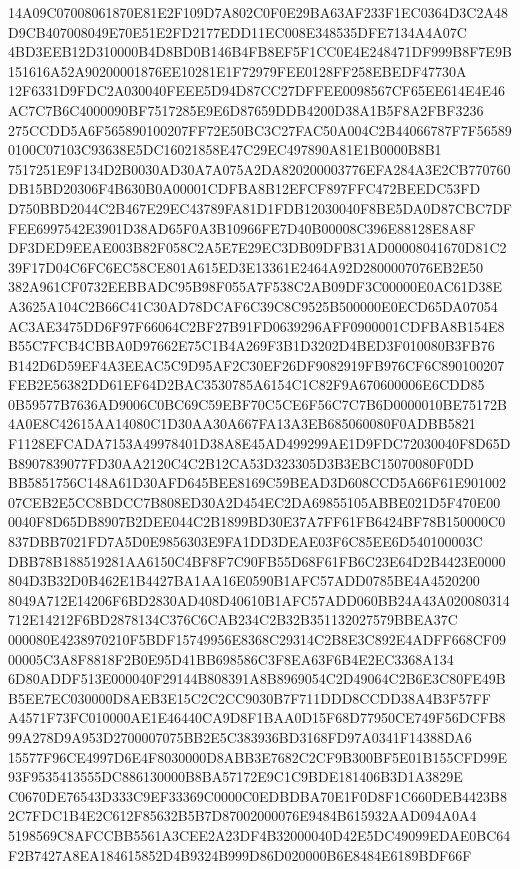 \documentclass[UTF8,fontset=fandol,zihao=-4,a4paper]{ctexart}
\begin{document}
{{14A09C07008061870E81E2F109D7A802C0F0E29BA63AF233F1EC0364D3C2A48D9CB407008049E70E51E2FD2177EDD11EC008E348535DFE7134A4A07C
4BD3EEB12D310000B4D8BD0B146B4FB8EF5F1CC0E4E248471DF999B8F7E9B151616A52A90200001876EE10281E1F72979FEE0128FF258EBEDF47730A
12F6331D9FDC2A030040FEEE5D94D87CC27DFFEE0098567CF65EE614E4E46AC7C7B6C4000090BF7517285E9E6D87659DDB4200D38A1B5F8A2FBF3236
275CCDD5A6F565890100207FF72E50BC3C27FAC50A004C2B44066787F7F565890100C07103C93638E5DC16021858E47C29EC497890A81E1B0000B8B1
7517251E9F134D2B0030AD30A7A075A2DA820200003776EFA284A3E2CB770760DB15BD20306F4B630B0A00001CDFBA8B12EFCF897FFC472BEEDC53FD
D750BBD2044C2B467E29EC43789FA81D1FDB12030040F8BE5DA0D87CBC7DFFEE6997542E3901D38AD65F0A3B10966FE7D40B00008C396E88128E8A8F
DF3DED9EEAE003B82F058C2A5E7E29EC3DB09DFB31AD00008041670D81C239F17D04C6FC6EC58CE801A615ED3E13361E2464A92D2800007076EB2E50
382A961CF0732EEBBADC95B98F055A7F538C2AB09DF3C00000E0AC61D38EA3625A104C2B66C41C30AD78DCAF6C39C8C9525B500000E0ECD65DA07054
AC3AE3475DD6F97F66064C2BF27B91FD0639296AFF0900001CDFBA8B154E8B55C7FCB4CBBA0D97662E75C1B4A269F3B1D3202D4BED3F010080B3FB76
B142D6D59EF4A3EEAC5C9D95AF2C30EF26DF9082919FB976CF6C890100207FEB2E56382DD61EF64D2BAC3530785A6154C1C82F9A670600006E6CDD85
0B59577B7636AD9006C0BC69C59EBF70C5CE6F56C7C7B6D0000010BE75172B4A0E8C42615AA14080C1D30AA30A667FA13A3EB685060080F0ADBB5821
F1128EFCADA7153A49978401D38A8E45AD499299AE1D9FDC72030040F8D65DB8907839077FD30AA2120C4C2B12CA53D323305D3B3EBC15070080F0DD
BB5851756C148A61D30AFD645BEE8169C59BEAD3D608CCD5A66F61E90100207CEB2E5CC8BDCC7B808ED30A2D454EC2DA69855105ABBE021D5F470E00
0040F8D65DB8907B2DEE044C2B1899BD30E37A7FF61FB6424BF78B150000C0837DBB7021FD7A5D0E9856303E9FA1DD3DEAE03F6C85EE6D540100003C
DBB78B188519281AA6150C4BF8F7C90FB55D68F61FB6C23E64D2B4423E0000804D3B32D0B462E1B4427BA1AA16E0590B1AFC57ADD0785BE4A4520200
8049A712E14206F6BD2830AD408D40610B1AFC57ADD060BB24A43A020080314712E14212F6BD2878134C376C6CAB234C2B32B351132027579BBEA37C
000080E4238970210F5BDF15749956E8368C29314C2B8E3C892E4ADFF668CF0900005C3A8F8818F2B0E95D41BB698586C3F8EA63F6B4E2EC3368A134
6D80ADDF513E000040F29144B808391A8B8969054C2D49064C2B6E3C80FE49BB5EE7EC030000D8AEB3E15C2C2CC9030B7F711DDD8CCDD38A4B3F57FF
A4571F73FC010000AE1E46440CA9D8F1BAA0D15F68D77950CE749F56DCFB899A278D9A953D2700007075BB2E5C383936BD3168FD97A0341F14388DA6
15577F96CE4997D6E4F8030000D8ABB3E7682C2CF9B300BF5E01B155CFD99E93F9535413555DC886130000B8BA57172E9C1C9BDE181406B3D1A3829E
C0670DE76543D333C9EF33369C0000C0EDBDBA70E1F0D8F1C660DEB4423B82C7FDC1B4E2C612F85632B5B7D87002000076E9484B615932AAD094A0A4
5198569C8AFCCBB5561A3CEE2A23DF4B32000040D42E5DC49099EDAE0BC64F2B7427A8EA184615852D4B9324B999D86D020000B6E8484E6189BDF66F
}}
\end{document}
